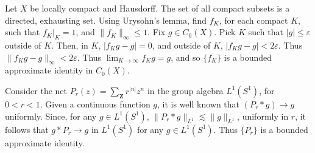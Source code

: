 \begin{example}
    Let $X$ be locally compact and Hausdorff. The set of all compact subsets is a directed, exhausting set. Using Urysohn's lemma, find $f_K$, for each compact $K$, such that $f_K |_K = 1$, and $\| f_K \|_\infty \leq 1$. Fix $g \in C_0(X)$. Pick $K$ such that $|g| \leq \varepsilon$ outside of $K$. Then, in $K$, $|f_K g - g| = 0$, and outside of $K$, $|f_K g - g| < 2 \varepsilon$. Thus $\| f_K g - g \|_\infty < 2 \varepsilon$. Thus $\lim_{K \to \infty} f_K g = g$, and so $\{ f_K \}$ is a bounded approximate identity in $C_0(X)$.
\end{example}

\begin{example}
    Consider the net $P_r(z) = \sum_\mathbf{Z} r^{|n|} z^n$ in the group algebra $L^1(S^1)$, for $0 < r < 1$. Given a continuous function $g$, it is well known that $(P_r * g) \to g$ uniformly. Since, for any $g \in L^1(S^1)$, $\| P_r * g \|_{L^1} \lesssim \| g \|_{L^1}$, uniformly in $r$, it follows that $g * P_r \to g$ in $L^1(S^1)$ for any $g \in L^1(S^1)$. Thus $\{ P_r \}$ is a bounded approximate identity.
\end{example}

